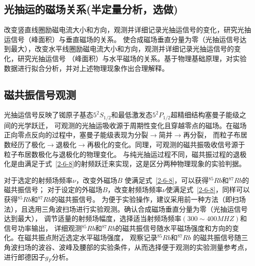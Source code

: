 \documentclass[11pt,a4paper]{article}
\begin{document}
\begin{spacing}{1.3}
\begin{CJK*}{UTF8}{gbsn}
\subsection{光抽运的磁场关系(半定量分析，选做)}
改变竖直线圈励磁电流大小和方向，观测并详细记录光抽运信号的变化，研究光抽运信号（峰面积）与垂直磁场的关系。
使合成磁场垂直分量为零（光抽运信号达到最大），改变水平线圈励磁电流大小和方向，观测并详细记录光抽运信号的变化，研究光抽运信号
（峰面积）与水平磁场的关系。基于物理基础原理，对实验数据进行拟合分析，并对上述物理现象作出合理解释。

\subsection{磁共振信号观测}
光抽运信号反映了铷原子基态$5^2S_{1/2}$和最低激发态$5^2P_{1/2}$超精细结构塞曼子能级之间的光学跃迁，
可观测的光抽运吸收源于周期性变化且穿越零点的磁场。在磁场正向零点反向的过程中，塞曼子能级表现为分裂$\to$简并$\to$再分裂，
而粒子布居数经历了极化$\to$退极化$\to$再极化的变化。同理，可观测的磁共振吸收信号源于粒子布居数极化与退极化的物理变化。
与纯光抽运过程不同，磁共振过程的退极化是由满足于式~\eqref{2-6-8}的射频跃迁来实现，这是区分两种物理现象的实验判据。\par
对于选定的射频场频率$\nu$，改变外磁场$B$ 使满足式~\eqref{2-6-8}，可以获得$^{85}Rb$和$^{87}Rb$的磁共振信号；
对于设定的外磁场$B$，改变射频场频率$\nu$使满足式~\eqref{2-6-8}，同样可以获得$^{85}Rb$和$^{87}Rb$的磁共振信号。
为便于实验操作，建议采用前一种方法（即扫场法），且选用三角波扫场进行实验观测。确认合成磁场垂直分量为零（光抽运信号达到最大），
调节适量的射频场幅度，选择适当射频场频率$(300\sim 400MHZ)$和信号功率输出，
详细观测$^{85}Rb$和$^{87}Rb$的磁共振信号随水平磁场强度和方向的变化。在磁共振点附近选定水平磁场强度，
观察记录$^{85}Rb$和$^{87}Rb$ 的磁共振信号随三角波扫场的波谷、波峰及腰部的实验条件，从而选择便于观测的实验测量参考点，
进行郎德因子$g_F$分析。


\end{CJK*}
\end{spacing}
\end{document}

